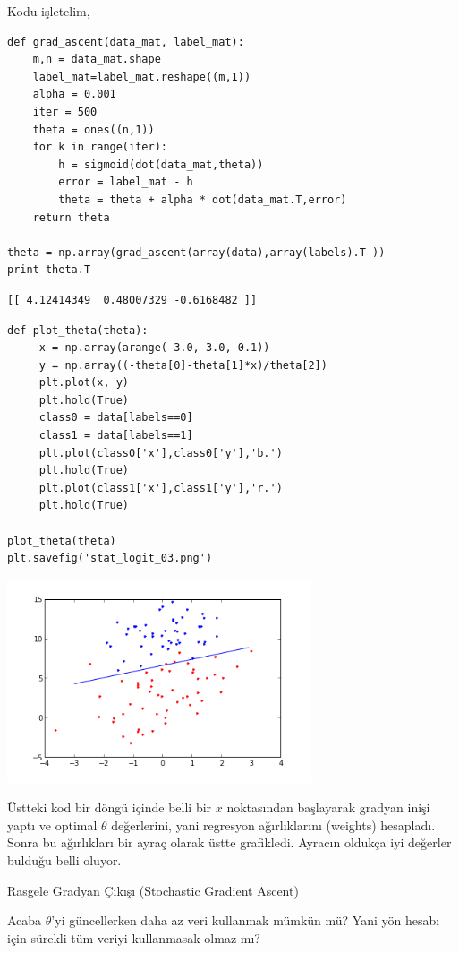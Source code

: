 \documentclass[12pt,fleqn]{article}\usepackage{../../common}
\begin{document}
Kodu işletelim,

\begin{verbatim}
def grad_ascent(data_mat, label_mat):
    m,n = data_mat.shape
    label_mat=label_mat.reshape((m,1))
    alpha = 0.001
    iter = 500
    theta = ones((n,1))
    for k in range(iter):   
        h = sigmoid(dot(data_mat,theta))
        error = label_mat - h
        theta = theta + alpha * dot(data_mat.T,error) 
    return theta

theta = np.array(grad_ascent(array(data),array(labels).T ))
print theta.T
\end{verbatim}

\begin{verbatim}
[[ 4.12414349  0.48007329 -0.6168482 ]]
\end{verbatim}


\begin{verbatim}
def plot_theta(theta):
     x = np.array(arange(-3.0, 3.0, 0.1))
     y = np.array((-theta[0]-theta[1]*x)/theta[2])
     plt.plot(x, y)
     plt.hold(True)
     class0 = data[labels==0]
     class1 = data[labels==1]
     plt.plot(class0['x'],class0['y'],'b.')
     plt.hold(True)
     plt.plot(class1['x'],class1['y'],'r.')
     plt.hold(True)

plot_theta(theta)
plt.savefig('stat_logit_03.png')
\end{verbatim}

\includegraphics[height=6cm]{stat_logit_03.png}

Üstteki kod bir döngü içinde belli bir $x$ noktasından başlayarak gradyan inişi
yaptı ve optimal $\theta$ değerlerini, yani regresyon ağırlıklarını (weights)
hesapladı. Sonra bu ağırlıkları bir ayraç olarak üstte grafikledi.  Ayracın
oldukça iyi değerler bulduğu belli oluyor.

Rasgele Gradyan Çıkışı (Stochastic Gradient Ascent)

Acaba $\theta$'yi güncellerken daha az veri kullanmak mümkün mü? Yani yön hesabı
için sürekli tüm veriyi kullanmasak olmaz mı?
\end{document}
